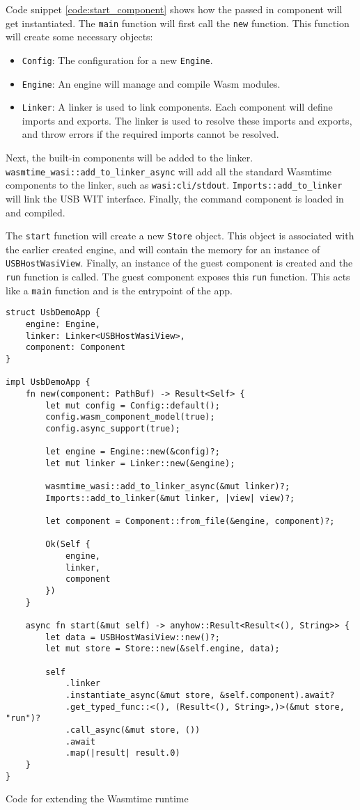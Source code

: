 Code snippet \ref{code:start_component} shows how the passed in component will get instantiated. The \texttt{main} function will first call the \texttt{new} function. This function will create some necessary objects: 
\begin{itemize}
\item \texttt{Config}: The configuration for a new \texttt{Engine}.
\item \texttt{Engine}: An engine will manage and compile Wasm modules.
\item \texttt{Linker}: A linker is used to link components. Each component will define imports and exports. The linker is used to resolve these imports and exports, and throw errors if the required imports cannot be resolved.
\end{itemize}

Next, the built-in components will be added to the linker. \texttt{wasmtime\_wasi::add\_to\_linker\_async} will add all the standard Wasmtime components to the linker, such as \texttt{wasi:cli/stdout}. \texttt{Imports::add\_to\_linker} will link the USB \acrshort{WIT} interface. Finally, the command component is loaded in and compiled.

The \texttt{start} function will create a new \texttt{Store} object. This object is associated with the earlier created engine, and will contain the memory for an instance of \texttt{USBHostWasiView}. Finally, an instance of the guest component is created and the \texttt{run} function is called. The guest component exposes this \texttt{run} function. This acts like a \texttt{main} function and is the entrypoint of the app.

\begin{code}
\begin{verbatim}
struct UsbDemoApp {
	engine: Engine,
	linker: Linker<USBHostWasiView>,
	component: Component
}

impl UsbDemoApp {
	fn new(component: PathBuf) -> Result<Self> {
		let mut config = Config::default();
		config.wasm_component_model(true);
		config.async_support(true);

		let engine = Engine::new(&config)?;
		let mut linker = Linker::new(&engine);

		wasmtime_wasi::add_to_linker_async(&mut linker)?;
		Imports::add_to_linker(&mut linker, |view| view)?;
		
		let component = Component::from_file(&engine, component)?;

		Ok(Self {
			engine,
			linker,
			component
		})
	}

	async fn start(&mut self) -> anyhow::Result<Result<(), String>> {
		let data = USBHostWasiView::new()?;
		let mut store = Store::new(&self.engine, data);

		self
			.linker
			.instantiate_async(&mut store, &self.component).await?
			.get_typed_func::<(), (Result<(), String>,)>(&mut store, "run")?
			.call_async(&mut store, ())
			.await
			.map(|result| result.0)
	}
}
\end{verbatim} 
\caption{Code for extending the Wasmtime runtime}
\label{code:start_component}
\end{code}